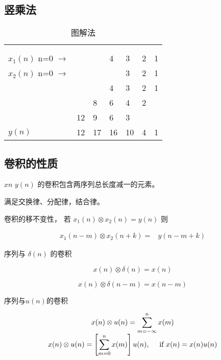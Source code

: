 \documentclass[cn,11pt,chinese,black,simple]{../elegantbook}
\begin{document}
\subsection{竖乘法}


\begin{example}
      
    \begin{longtable}{lllllll}
        \caption{图解法} \\ 
        \\ 
        \endfirsthead
        
        \\ 
        \endhead 
    
        \\   
        \endfoot
    
        \endlastfoot
        \(x_1(n)\) n=0 \(\rightarrow\)  & \textbf{} &  & {4} & 3  & 2 & 1 \\
        \(x_2(n)\) n=0 \(\rightarrow\) &          &          &            & 3  & 2 & 1 \\ \hline
            &         &           & {4} & 3  & 2 & 1 \\
          &           & 8         & 6          & 4  & 2 &   \\
          & 12        & 9         & 6          & 3  &   &   \\ \hline
         \(y(n)\) & 12        & 17        & 16         & 10 & 4 & 1
    \end{longtable}
\end{example}

\subsection{卷积的性质}

\(x{n}\) \(y(n)\) 的卷积包含两序列总长度减一的元素。

满足交换律、分配律，结合律。 

卷积的移不变性，\(
    \text { 若 } x_{1}(n) \otimes x_{2}(n)=y(n) \text { 则 } \)

\[
\begin{aligned}
x_{1}(n-m) \otimes x_{2}(n+k)=& y(n-m+k)
\end{aligned}
\]

序列与 \(\delta(n)\) 的卷积

\[
x(n) \otimes \delta(n)=x(n)
\]

\[
x(n) \otimes \delta(n-m)=x(n-m)
\]

序列与\(u(n)\)的卷积

\[
\begin{array}{c}
x(n) \otimes u(n)=\displaystyle\sum_{m=-\infty}^{n} x(m) \\
x(n) \otimes u(n)=\left[ \displaystyle\sum_{m=0}^{n} x(m)\right] u(n), \quad \text { if } x(n)=x(n) u(n)
\end{array}
\]



\ifx\mainclass\undefined
\end{document}
